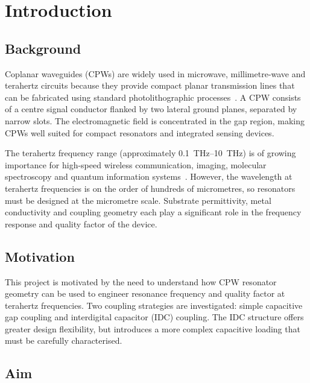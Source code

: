 \documentclass[12pt,a4paper]{article}
\begin{document}
\newpage
\section{Introduction}
\label{sec:intro}

\subsection{Background}

Coplanar waveguides (CPWs) are widely used in microwave, millimetre-wave
and terahertz circuits because they provide compact planar transmission
lines that can be fabricated using standard photolithographic
processes~\cite{Wen1969}. A CPW consists of a centre signal conductor
flanked by two lateral ground planes, separated by narrow slots. The
electromagnetic field is concentrated in the gap region, making CPWs
well suited for compact resonators and integrated sensing devices.

The terahertz frequency range (approximately \SIrange{0.1}{10}{\tera\hertz})
is of growing importance for high-speed wireless communication, imaging,
molecular spectroscopy and quantum information
systems~\cite{Siegel2002}. However, the wavelength at terahertz
frequencies is on the order of hundreds of micrometres, so resonators
must be designed at the micrometre scale. Substrate permittivity, metal
conductivity and coupling geometry each play a significant role in the
frequency response and quality factor of the device.

\subsection{Motivation}

This project is motivated by the need to understand how CPW resonator
geometry can be used to engineer resonance frequency and quality factor
at terahertz frequencies. Two coupling strategies are investigated:
simple capacitive gap coupling and interdigital capacitor (IDC) coupling.
The IDC structure offers greater design flexibility, but introduces a
more complex capacitive loading that must be carefully characterised.

\subsection{Aim}
\end{document}
